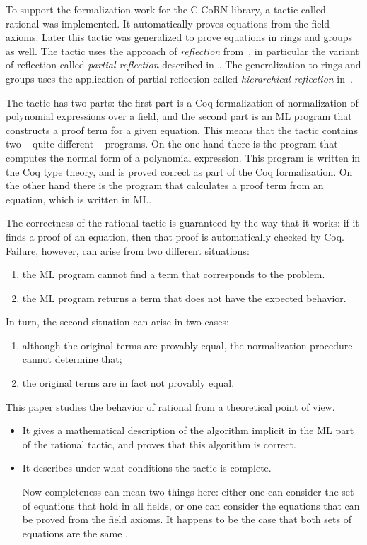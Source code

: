 \documentclass{article}
\newcommand{\tacticname}[1]{\textsf{#1}}
\newcommand{\rational}{\tacticname{rational}}
\begin{document}
To support the formalization work for the C-CoRN library,
a tactic called {\rational} was implemented.
It automatically proves equations from the field axioms.
Later this tactic was generalized to prove equations in
rings and groups as well.
The tactic uses the approach of \emph{reflection} from~\cite{ACHA90},
in particular the variant of reflection called \emph{partial reflection}
described in~\cite{geu:wie:zwa:00}.
The generalization to rings and groups uses the application
of partial reflection called \emph{hierarchical reflection} in~\cite{lcf:wie:04}.

The tactic has two parts: the first part is a Coq formalization of
normalization of polynomial expressions over a field, and the second
part is an ML program that constructs a proof term for a given
equation.
This means that the tactic contains two -- quite different --
programs.  On the one hand there is the program that computes the
normal form of a polynomial expression.
This program is written in the Coq type theory, and is proved correct
as part of the Coq formalization.
On the other hand there is the program that calculates a proof term
from an equation, which is written in ML.

The correctness of the {\rational} tactic is guaranteed by the way
that it works: if it finds a proof of an equation, then that proof is
automatically checked by Coq.
Failure, however, can arise from two different
situations:
\begin{enumerate}[(1)]
\item the ML program cannot find a term that corresponds to the problem.
\item the ML program returns a term that does not have the expected behavior.
\end{enumerate}
In turn, the second situation can arise in two cases:
\begin{enumerate}[(2a)]
\item although the original terms are provably equal, the normalization
procedure cannot determine that;
\item the original terms are in fact not provably equal.
\end{enumerate}
This paper studies the behavior of {\rational} from a theoretical
point of view.
\begin{itemize}
\item
It gives a mathematical description of the algorithm implicit in the
ML part of the {\rational} tactic, and proves that this algorithm is
correct.
\item
It describes under what conditions the tactic is complete.

Now completeness can mean two things here:
either one can consider the set of equations that hold in all fields,
or one can consider the equations that can be proved from the field axioms.
It happens to be the case that both sets of equations are the same \cite{cha:key:90}.


\end{itemize}
\end{document}
